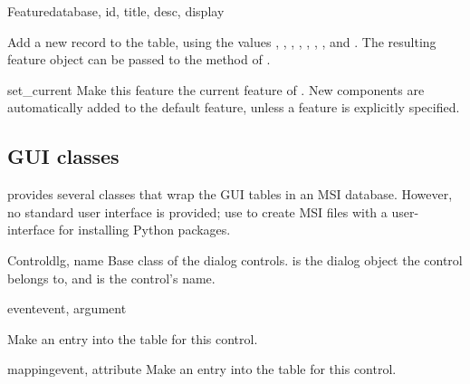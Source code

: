 \begin{classdesc}{Feature}{database, id, title, desc, display}

  Add a new record to the  table, using the values
  , , , , ,
  , , and . The resulting
  feature object can be passed to the  method
  of .
\end{classdesc}

\begin{methoddesc}[Feature]{set_current}{}
  Make this feature the current feature of .
  New components are automatically added to the default feature,
  unless a feature is explicitly specified.
\end{methoddesc}

\begin{seealso}
\end{seealso}

\subsection{GUI classes\label{msi-gui}}

 provides several classes that wrap the GUI tables in
an MSI database. However, no standard user interface is provided; use
 to create MSI files with a user-interface for
installing Python packages.

\begin{classdesc}{Control}{dlg, name}
  Base class of the dialog controls.  is the dialog object
  the control belongs to, and  is the control's name.
\end{classdesc}

\begin{methoddesc}[Control]{event}{event, argument}

  Make an entry into the  table for this control.
\end{methoddesc}

\begin{methoddesc}[Control]{mapping}{event, attribute}
  Make an entry into the  table for this control.
\end{methoddesc}

